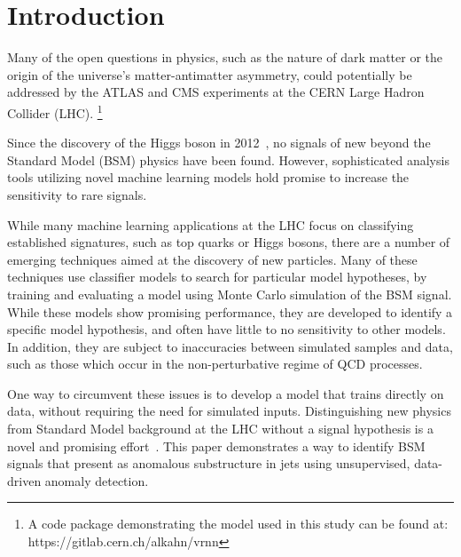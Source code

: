 \documentclass[12pt, a4paper]{article}
\newcommand\blfootnote[1]{%
  \begingroup
  \renewcommand\thefootnote{}\footnote{#1}%
  \addtocounter{footnote}{-1}%
  \endgroup
}
\begin{document}
\clearpage


\clearpage







\section{Introduction}



Many of the open questions in physics, such as the nature of dark matter or the origin of the universe's matter-antimatter asymmetry, could potentially be addressed by the ATLAS and CMS experiments at the CERN Large Hadron Collider (LHC).\blfootnote{A code package demonstrating the model used in this study can be found at: https://gitlab.cern.ch/alkahn/vrnn}
Since the discovery of the Higgs boson in 2012~\cite{atlas_higgs,cms_higgs}, no signals of new beyond the Standard Model (BSM) physics have been found. 
However, sophisticated analysis tools utilizing novel machine learning models hold promise to increase the sensitivity to rare signals. 
 
While many machine learning applications at the LHC focus on classifying established signatures, such as top quarks or Higgs bosons, there are a number of emerging techniques aimed at the discovery of new particles. 
Many of these techniques use classifier models to search for particular model hypotheses, by training and evaluating a model using Monte Carlo simulation of the BSM signal.
While these models show promising performance, they are developed to identify a specific model hypothesis, and often have little to no sensitivity to other models. In addition, they are subject to inaccuracies between simulated samples and data, such as those which occur in the non-perturbative regime of QCD processes.

One way to circumvent these issues is to develop a model that trains directly on data, without requiring the need for simulated inputs.
Distinguishing new physics from Standard Model background at the LHC without a signal hypothesis is a novel and promising effort~\cite{qcdorwhat, deepAutoencoders, CWoLa}. 
This paper demonstrates a way to identify BSM signals that present as anomalous substructure in jets using unsupervised, data-driven anomaly detection. 
\end{document}
